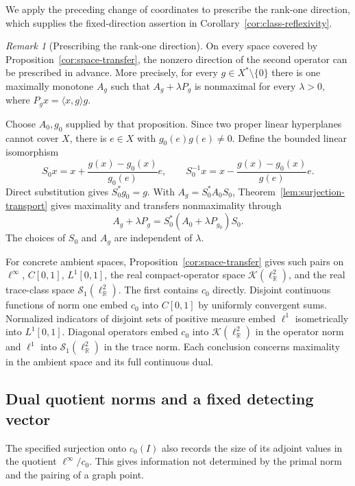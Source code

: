 \documentclass[11pt]{article}
\newcommand{\R}{\mathbb R}
\newcommand{\pair}[2]{\langle #1,#2\rangle}
\theoremstyle{definition}
\theoremstyle{remark}
\newtheorem{remark}{Remark}
\begin{document}
We apply the preceding change of coordinates to prescribe the rank-one direction, which supplies the fixed-direction assertion in Corollary~\ref{cor:class-reflexivity}.

\begin{remark}[Prescribing the rank-one direction]
\label{rem:prescribed-direction}
On every space covered by Proposition~\ref{cor:space-transfer}, the nonzero direction of the second operator can be prescribed in advance. More precisely, for every $g\in X^*\setminus\{0\}$ there is one maximally monotone $A_g$ such that $A_g+\lambda P_g$ is nonmaximal for every $\lambda>0$, where $P_gx=\pair{x}{g}g$.

Choose $A_0,g_0$ supplied by that proposition. Since two proper linear hyperplanes cannot cover $X$, there is $e\in X$ with $g_0(e)g(e)\ne0$. Define the bounded linear isomorphism
\[
S_0x=x+\frac{g(x)-g_0(x)}{g_0(e)}e,\qquad
S_0^{-1}x=x-\frac{g(x)-g_0(x)}{g(e)}e.
\]
Direct substitution gives $S_0^*g_0=g$. With $A_g=S_0^*A_0S_0$, Theorem~\ref{lem:surjection-transport} gives maximality and transfers nonmaximality through
\[
A_g+\lambda P_g=S_0^*(A_0+\lambda P_{g_0})S_0.
\]
The choices of $S_0$ and $A_g$ are independent of $\lambda$.
\end{remark}


For concrete ambient spaces, Proposition~\ref{cor:space-transfer} gives such pairs on $\ell^\infty$, $C[0,1]$, $L^1[0,1]$, the real compact-operator space $\mathcal K(\ell^2_{\R})$, and the real trace-class space $\mathcal S_1(\ell^2_{\R})$. The first contains $c_0$ directly. Disjoint continuous functions of norm one embed $c_0$ into $C[0,1]$ by uniformly convergent sums. Normalized indicators of disjoint sets of positive measure embed $\ell^1$ isometrically into $L^1[0,1]$. Diagonal operators embed $c_0$ into $\mathcal K(\ell^2_{\R})$ in the operator norm and $\ell^1$ into $\mathcal S_1(\ell^2_{\R})$ in the trace norm. Each conclusion concerns maximality in the ambient space and its full continuous dual.

\subsection{Dual quotient norms and a fixed detecting vector}
\label{subsec:appendix-dual-quotient}

The specified surjection onto $c_0(I)$ also records the size of its adjoint values in the quotient $\ell^\infty/c_0$. This gives information not determined by the primal norm and the pairing of a graph point.
\end{document}

